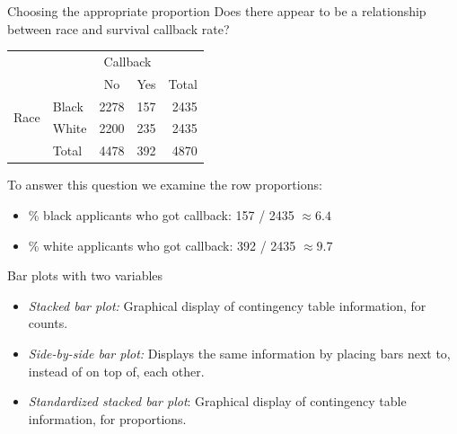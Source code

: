 \documentclass[notes,11pt, aspectratio=169]{beamer}
\newcommand{\hl}[1]{\textit{\textcolor{hlblue}{#1}}}
\begin{document}
\begin{frame}[fragile]{Choosing the appropriate proportion}
Does there appear to be a relationship between race and survival callback rate?
\begin{center}
\begin{tabular}{l l cc r}
					               & 			 & \multicolumn{2}{c}{{Callback}} \\
  \cline{3-4}
					               &			 & No	 & Yes	& Total \\ 
  \cline{2-5}
\multirow{2}{*}{{Race}}& Black & 2278  & 157	  	& 2435 \\ 
  					             & White & 2200	 & 235 	    & 2435 \\ 
  \cline{2-5}
  					             & Total & 4478  & 392	    &  4870 \\
  \cline{2-5}
\end{tabular}
\end{center}
\pause

To answer this question we examine the row proportions: 

\pause

\begin{itemize}

\item \% black applicants who got callback: 157 / 2435 $\approx 6.4$ \\

\pause

\item \% white applicants who got callback: 392 / 2435 $\approx 9.7$ \\

\end{itemize}

\end{frame}


\begin{frame}[fragile]{Bar plots with two variables}

\begin{itemize}

\item \hl{Stacked bar plot:} Graphical display of contingency table information,
for counts.

\item \hl{Side-by-side bar plot:} Displays the same information by placing bars 
next to, instead of on top of, each other.

\item \hl{Standardized stacked bar plot}: Graphical display of contingency table 
information, for proportions.

\end{itemize}
\end{frame}
\end{document}
